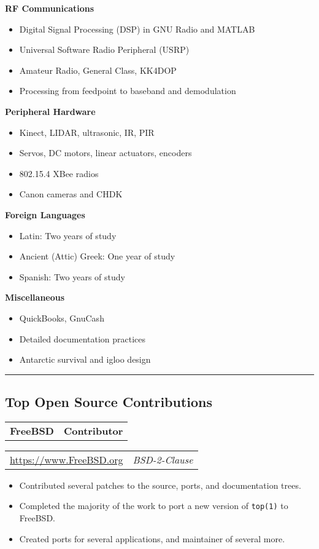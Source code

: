 \documentclass[10pt,letterpaper]{article}
\newcommand{\headerrow}[2]{%
    \begin{tabularx}{\linewidth}{Xr}
	    #1 & #2 \\
    \end{tabularx}
}
\begin{document}
    \textbf{RF Communications}
    \begin{itemize}[label=--]
        \item Digital Signal Processing (DSP) in GNU Radio and MATLAB
        \item Universal Software Radio Peripheral (USRP)
        \item Amateur Radio, General Class, KK4DOP
        \item Processing from feedpoint to baseband and demodulation
    \end{itemize}
    \textbf{Peripheral Hardware}
    \begin{itemize}[label=--]
        \item Kinect, LIDAR, ultrasonic, IR, PIR
        \item Servos, DC motors, linear actuators, encoders
        \item 802.15.4 XBee radios
        \item Canon cameras and CHDK
    \end{itemize}
    \textbf{Foreign Languages}
    \begin{itemize}[label=--]
        \item Latin: Two years of study
        \item Ancient (Attic) Greek: One year of study
        \item Spanish: Two years of study
    \end{itemize}
    \textbf{Miscellaneous}
    \begin{itemize}[label=--]
        \item QuickBooks, GnuCash
        \item Detailed documentation practices
        \item Antarctic survival and igloo design
    \end{itemize}

\vspace{2pt}
\hrule
\vspace{-0.4em}
\subsection*{Top Open Source Contributions}
    \headerrow{\textbf{FreeBSD}}{\textbf{Contributor}}
    \headerrow{\url{https://www.FreeBSD.org}}{\textit{BSD-2-Clause}}
    \begin{itemize}[label=--]
        \item Contributed several patches to the source, ports, and
            documentation trees.

        \item Completed the majority of the work to port a new version of
            \texttt{top(1)} to FreeBSD\@. %

        \item Created ports for several applications, and maintainer of
            several more.
    \end{itemize}
\end{document}
